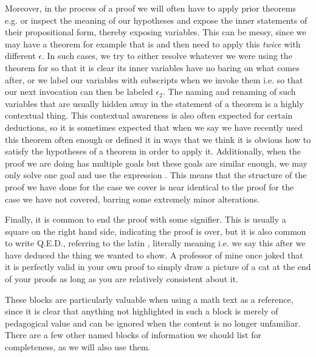 \documentclass[11pt]{article}
\begin{document}
\begin{itemize}
    Moreover, in the process of a proof we will often have to apply prior theorems e.g.  or inspect the meaning of our hypotheses and expose the inner statements of their propositional form, thereby exposing variables. This can be messy, since we may have a theorem for example that is  and then need to apply this \emph{twice} with different $\epsilon$. In such cases, we try to either resolve whatever we were using the theorem for so that it is clear its inner variables have no baring on what comes after, or we label our variables with subscripts when we invoke them i.e.  so that our next invocation can then be labeled $\epsilon_2$. The naming and renaming of such variables that are usually hidden away in the statement of a theorem is a highly contextual thing. This contextual awareness is also often expected for certain  deductions, so it is sometimes expected that when we say  we have recently used this theorem often enough or defined it in ways that we think it is obvious how to satisfy the hypotheses of a theorem in order to apply it. Additionally, when the proof we are doing has multiple goals but these goals are similar enough, we may only solve one goal and use the expression . This means that the structure of the proof we have done for the case we cover is near identical to the proof for the case we have not covered, barring some extremely minor alterations.

    Finally, it is common to end the proof with some signifier. This is usually a square on the right hand side, indicating the proof is over, but it is also common to write Q.E.D., referring to the latin , literally meaning  i.e. we say this after we have deduced the thing we wanted to show. A professor of mine once joked that it is perfectly valid in your own proof to simply draw a picture of a cat at the end of your proofs as long as you are relatively consistent about it.
\end{itemize}

These blocks are particularly valuable when using a math text as a reference, since it is clear that anything not highlighted in such a block is merely of pedagogical value and can be ignored when the content is no longer unfamiliar. There are a few other named blocks of information we should list for completeness, as we will also use them.
\end{document}
